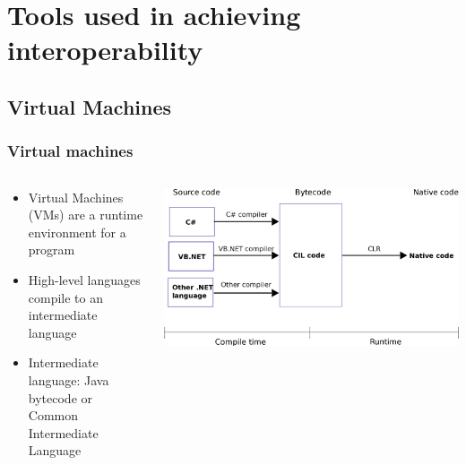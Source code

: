 \documentclass{beamer}
\begin{document}


\section[Interop Tools]{Tools used in achieving interoperability}

\subsection{Virtual Machines}

\begin{frame}
  \frametitle{Virtual machines}
  
  \begin{columns}
  \begin{column}{0.6\textwidth}
  \begin{itemize}
	\item Virtual Machines (VMs) are a runtime environment for a program
	\item High-level languages compile to an intermediate language
	\item Intermediate language: Java bytecode or Common Intermediate Language
  \end{itemize}
  \end{column}
  
  \begin{column}{0.5\textwidth}
  \includegraphics[width=1\textwidth]{graphics/CLR.png}
    \\
  \end{column}
  \end{columns}
\end{frame}
\end{document}
